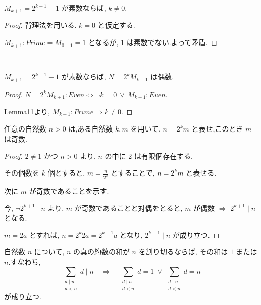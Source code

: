 \begin{lemma}\label{ne_zero_of_prime_mersenne}\leanok
{}
\(M_{k+1} = 2^{k+1} - 1\) が素数ならば, \(k \neq 0\).
\end{lemma}

\begin{proof}
背理法を用いる. \(k = 0\) と仮定する.

\(M_{k+1} : Prime = M_{0+1} = 1\) となるが, \(1\) は素数でない.よって矛盾.
\end{proof}


\begin{theorem}\label{even_two_pow_mul_mersenne_of_prime}
\leanok{}~\

\(M_{k+1} = 2^{k+1} - 1\) が素数ならば, \(N = 2^kM_{k+1}\) は偶数.

\end{theorem}

\begin{proof}
\(N = 2^kM_{k+1} : Even \Leftrightarrow \lnot k = 0 ~\vee ~M_{k+1} : Even\).

Lemma11より, \(M_{k+1} : Prime \Rightarrow k \neq 0\).
\end{proof}


\begin{lemma}\label{eq_two_pow_mul_odd}\leanok
任意の自然数 \(n > 0\) は,ある自然数 \(k, m\) を用いて, \(n = 2^km\) と表せ,このとき \(m\) は奇数.
\end{lemma}

\begin{proof}
\(2 \neq 1\) かつ \(n > 0\) より, \(n\) の中に \(2\) は有限個存在する.

その個数を \(k\) 個とすると, \(m = \frac{n}{2^k}\) とすることで, \(n = 2^km\) と表せる.

次に \(m\) が奇数であることを示す.

今, \(\lnot 2^{k+1} \mid n\) より, \(m\) が奇数であることと対偶をとると,
\(m\) が偶数 \(\Rightarrow\) \(2^{k+1} \mid n\) となる.

\(m = 2a\) とすれば, \(n = 2^k2a = 2^{k+1}a\) となり, \(2^{k+1} \mid n\) が成り立つ.
\end{proof}

\begin{lemma}\label{sum_properDivisors_dvd}\leanok

自然数 \(n\) について, \(n\) の真の約数の和が \(n\) を割り切るならば, その和は \(1\) または \(n\).すなわち,
\[
\sum_{\substack{d \mid n\\ d < n}} d \mid n \quad \Rightarrow \quad \sum_{\substack{d \mid n\\ d < n}} d = 1 ~\vee~ \sum_{\substack{d \mid n\\ d < n}} d = n
\]
が成り立つ.
\end{lemma}

